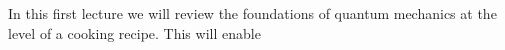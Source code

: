 In this first lecture we will review the foundations of quantum mechanics at the level of a cooking recipe. This will enable